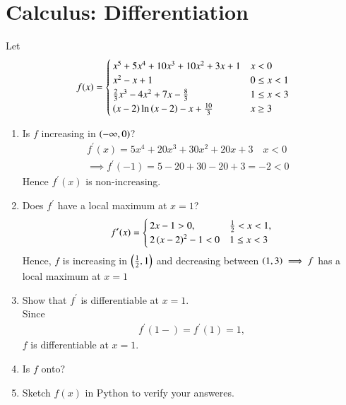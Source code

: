 \documentclass[journal,12pt,twocolumn]{IEEEtran}
\renewcommand\thesection{\arabic{section}}
\begin{document}
\section{Calculus: Differentiation}
Let 
{\small
\begin{align}
f(x) = 
\begin{cases}
x^5+5x^4+10x^3+10x^2+3x+1 & x < 0
\\
x^2-x+1 & 0 \le  x < 1
\\
\frac{2}{3}x^3-4x^2+7x-\frac{8}{3} & 1 \le x < 3
\\
\left(x-2\right)\ln \left(x-2\right)-x + \frac{10}{3} & x \ge 3
\end{cases}
\end{align}
}
\begin{enumerate}[label=\thesection.\arabic*
,ref=\thesection.\theenumi]
\item Is $f$ increasing in $\left(-\infty, 0\right)$?	
\\
\solution 
\begin{align}
f^{\prime}(x) = 5x^4+20x^3+30x^2+20x+3 \quad  x < 0 &
\nonumber \\
\implies f^{\prime}(-1) = 5-20+30-20+3 =-2 < 0 &
\end{align}
%
Hence $f^{\prime}(x)$ is non-increasing.

\item Does $f^{\prime}$ have a local maximum at $x = 1$?
\\
\solution 
\begin{align}
\label{eq:cont_diff}
f^{\prime}(x)=
\begin{cases}
  2x-1 > 0, &  \frac{1}{2} < x < 1,
\\
2\left(x-2\right)^2 -1 < 0 & 1 \le x < 3
\end{cases}
\end{align}
Hence, $f$ is increasing in $\left(\frac{1}{2},1\right)$ and decreasing between $\left(1, 3\right) \implies f$ has a local maximum at $x=1$
\item Show that $f^{\prime}$ is differentiable at $x = 1$.
\\
\solution Since
\begin{align}
f^{\prime}(1-)=
f^{\prime}(1)=1,
\end{align}
$f$ is differentiable at $x = 1$.
\item Is $f$ onto?
\item Sketch $f(x)$ in Python to verify your answeres.

\end{enumerate}
\end{document}
